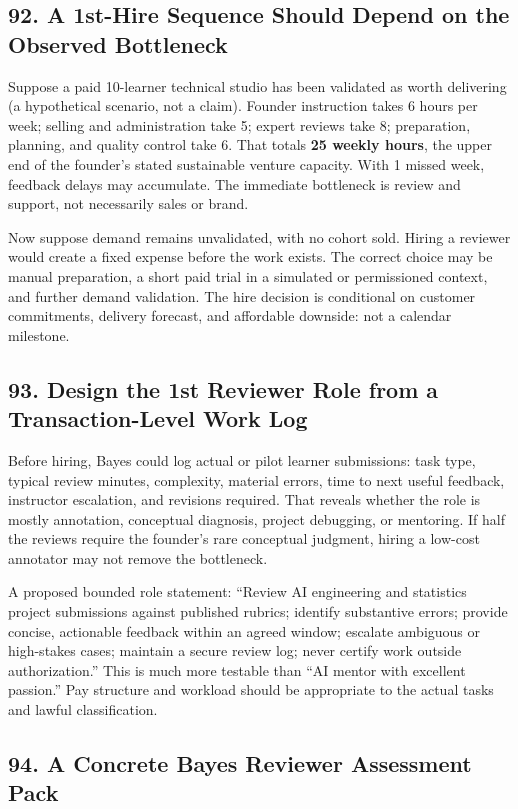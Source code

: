 \subsection*{92. A 1st-Hire Sequence Should Depend on the Observed Bottleneck}

Suppose a paid 10-learner technical studio has been validated as worth delivering (a hypothetical scenario, not a claim). Founder instruction takes 6 hours per week; selling and administration take 5; expert reviews take 8; preparation, planning, and quality control take 6. That totals \textbf{25 weekly hours}, the upper end of the founder's stated sustainable venture capacity. With 1 missed week, feedback delays may accumulate. The immediate bottleneck is review and support, not necessarily sales or brand.

Now suppose demand remains unvalidated, with no cohort sold. Hiring a reviewer would create a fixed expense before the work exists. The correct choice may be manual preparation, a short paid trial in a simulated or permissioned context, and further demand validation. The hire decision is conditional on customer commitments, delivery forecast, and affordable downside: not a calendar milestone.

\subsection*{93. Design the 1st Reviewer Role from a Transaction-Level Work Log}

Before hiring, Bayes could log actual or pilot learner submissions: task type, typical review minutes, complexity, material errors, time to next useful feedback, instructor escalation, and revisions required. That reveals whether the role is mostly annotation, conceptual diagnosis, project debugging, or mentoring. If half the reviews require the founder's rare conceptual judgment, hiring a low-cost annotator may not remove the bottleneck.

A proposed bounded role statement: ``Review AI engineering and statistics project submissions against published rubrics; identify substantive errors; provide concise, actionable feedback within an agreed window; escalate ambiguous or high-stakes cases; maintain a secure review log; never certify work outside authorization.'' This is much more testable than ``AI mentor with excellent passion.'' Pay structure and workload should be appropriate to the actual tasks and lawful classification.

\subsection*{94. A Concrete Bayes Reviewer Assessment Pack}

